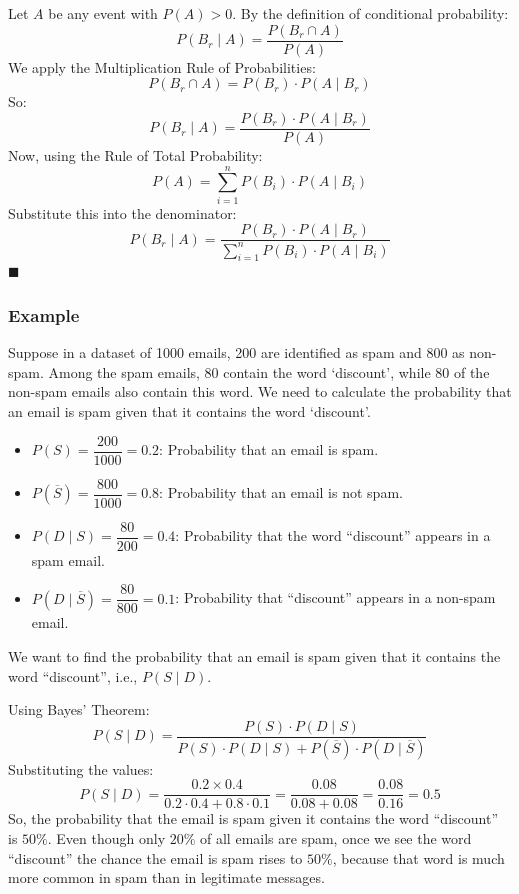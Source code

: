 \documentclass[twoside]{book}
\begin{document}
Let \( A \) be any event with \( P(A) > 0 \). By the definition of conditional probability:
\[
P(B_r \mid A) = \frac{P(B_r \cap A)}{P(A)}
\]
We apply the Multiplication Rule of Probabilities:
\[
P(B_r \cap A) = P(B_r) \cdot P(A \mid B_r)
\]
So:
\[
P(B_r \mid A) = \frac{P(B_r) \cdot P(A \mid B_r)}{P(A)}
\]
Now, using the Rule of Total Probability:
\[
P(A) = \sum_{i=1}^n P(B_i) \cdot P(A \mid B_i)
\]
Substitute this into the denominator:
\[
P(B_r \mid A) = \frac{P(B_r) \cdot P(A \mid B_r)}{\sum_{i=1}^{n} P(B_i) \cdot P(A \mid B_i)}
\]
\hfill\(\blacksquare\)

\subsubsection{Example}

Suppose in a dataset of 1000 emails, 200 are identified as spam and 800 as non-spam. Among the spam emails, 80 contain the word `discount', while 80 of the non-spam emails also contain this word. We need to calculate the probability that an email is spam given that it contains the word `discount'.
\begin{itemize}
    \item \( P(S) = \dfrac{200}{1000} = 0.2 \): Probability that an email is spam.
    \item \( P(\overline{S}) = \dfrac{800}{1000} = 0.8 \): Probability that an email is not spam.
    \item \( P(D \mid S) =\dfrac{80}{200} =  0.4 \): Probability that the word ``discount'' appears in a spam email.
    \item \( P(D \mid \overline{S})=\dfrac{80}{800} = 0.1 \): Probability that ``discount'' appears in a non-spam email.
\end{itemize}

We want to find the probability that an email is spam given that it contains the word ``discount'', i.e., \( P(S \mid D) \).

Using Bayes' Theorem:
\[
P(S \mid D) = \frac{P(S) \cdot P(D \mid S)}{P(S) \cdot P(D \mid S) + P(\overline{S}) \cdot P(D \mid \overline{S})}
\]
Substituting the values:
\[
P(S \mid D) = \frac{0.2 \times 0.4}{0.2 \cdot 0.4 + 0.8 \cdot 0.1}
= \frac{0.08}{0.08 + 0.08}
= \frac{0.08}{0.16} = 0.5
\]
So, the probability that the email is spam given it contains the word ``discount'' is \( 50\% \). Even though only \(20\%\) of all emails are spam, once we see the word ``discount'' the chance the email is spam rises to \(50\%\), because that word is much more common in spam than in legitimate messages.
\end{document}
